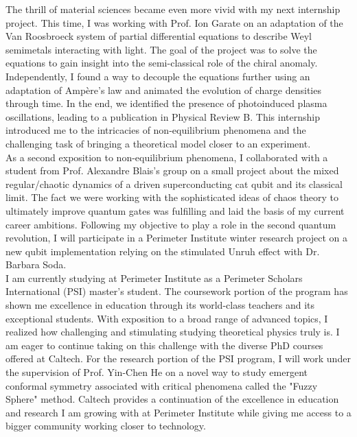 \documentclass[12pt]{article}
\begin{document}
The thrill of material sciences became even more vivid with my next internship project. This time, I was working with Prof. Ion Garate on an adaptation of the Van Roosbroeck system of partial differential equations to describe Weyl semimetals interacting with light. The goal of the project was to solve the equations to gain insight into the semi-classical role of the chiral anomaly. Independently, I found a way to decouple the equations further using an adaptation of Ampère's law and animated the evolution of charge densities through time. In the end, we identified the presence of photoinduced plasma oscillations, leading to a publication in Physical Review B. This internship introduced me to the intricacies of non-equilibrium phenomena and the challenging task of bringing a theoretical model closer to an experiment.\\[0.2cm] 

As a second exposition to non-equilibrium phenomena, I collaborated with a student from Prof. Alexandre Blais's group on a small project about the mixed regular/chaotic dynamics of a driven superconducting cat qubit and its classical limit. The fact we were working with the sophisticated ideas of chaos theory to ultimately improve quantum gates was fulfilling and laid the basis of my current career ambitions. Following my objective to play a role in the second quantum revolution, I will participate in a Perimeter Institute winter research project on a new qubit implementation relying on the stimulated Unruh effect with Dr. Barbara Soda. \\[0.2cm]


I am currently studying at Perimeter Institute as a Perimeter Scholars International (PSI) master's student. The coursework portion of the program has shown me excellence in education through its world-class teachers and its exceptional students. With exposition to a broad range of advanced topics, I realized how challenging and stimulating studying theoretical physics truly is. I am eager to continue taking on this challenge with the diverse PhD courses offered at Caltech. For the research portion of the PSI program, I will work under the supervision of Prof. Yin-Chen He on a novel way to study emergent conformal symmetry associated with critical phenomena called the "Fuzzy Sphere" method. Caltech provides a continuation of the excellence in education and research I am growing with at Perimeter Institute while giving me access to a bigger community working closer to technology. \\[0.2cm]
\end{document}
